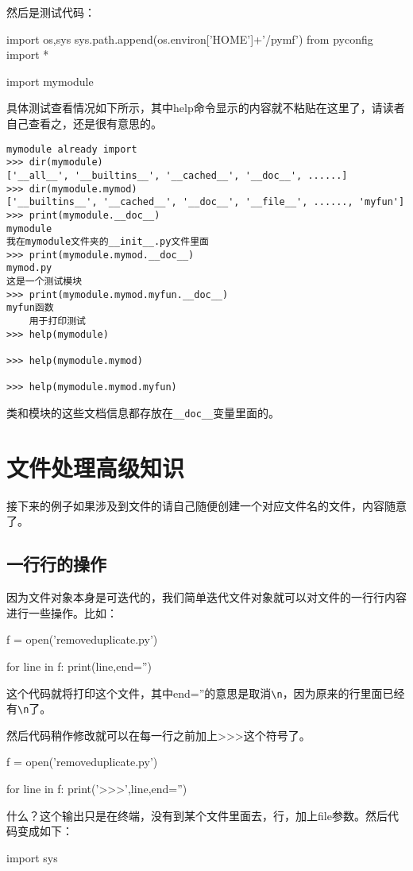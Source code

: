 \documentclass[12pt,oneside]{book}
\begin{document}
\begin{common-format}
然后是测试代码：
\begin{tcbpython}
import os,sys
sys.path.append(os.environ['HOME']+'/pymf')
from pyconfig import *

import  mymodule
\end{tcbpython}


具体测试查看情况如下所示，其中help命令显示的内容就不粘贴在这里了，请读者自己查看之，还是很有意思的。
\begin{Verbatim}
mymodule already import
>>> dir(mymodule)
['__all__', '__builtins__', '__cached__', '__doc__', ......]
>>> dir(mymodule.mymod)
['__builtins__', '__cached__', '__doc__', '__file__', ......, 'myfun']
>>> print(mymodule.__doc__)
mymodule
我在mymodule文件夹的__init__.py文件里面
>>> print(mymodule.mymod.__doc__)
mymod.py
这是一个测试模块
>>> print(mymodule.mymod.myfun.__doc__)
myfun函数
    用于打印测试
>>> help(mymodule)

>>> help(mymodule.mymod)

>>> help(mymodule.mymod.myfun)

\end{Verbatim}

类和模块的这些文档信息都存放在\verb+__doc__+变量里面的。




\chapter{文件处理高级知识}
接下来的例子如果涉及到文件的请自己随便创建一个对应文件名的文件，内容随意了。

\section{一行行的操作}
因为文件对象本身是可迭代的，我们简单迭代文件对象就可以对文件的一行行内容进行一些操作。比如：
\begin{tcbpython}
f = open('removeduplicate.py')

for line in f:
    print(line,end='')
\end{tcbpython}
这个代码就将打印这个文件，其中end=''的意思是取消\verb+\n+，因为原来的行里面已经有\verb+\n+了。

然后代码稍作修改就可以在每一行之前加上>>>这个符号了。 
\begin{tcbpython}
f = open('removeduplicate.py')

for line in f:
    print('>>>',line,end='')
\end{tcbpython}

什么？这个输出只是在终端，没有到某个文件里面去，行，加上file参数。然后代码变成如下：
\begin{tcbpython}
import sys


\end{tcbpython}
\end{common-format}
\end{document}
